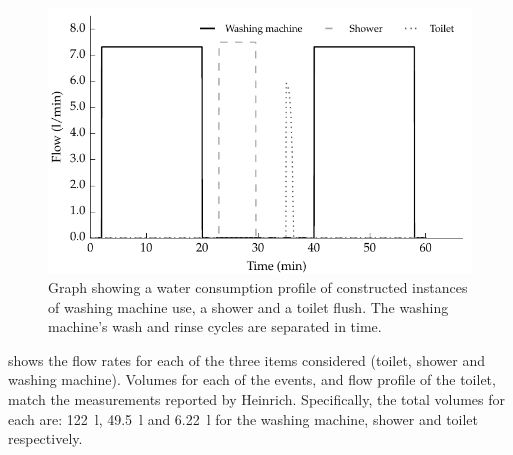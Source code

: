     \begin{figure}
      \centering
      \includegraphics[width=\linewidth]{content/pt1/02-WirelessWaterMeter/graphics/graph_profile}
      \caption[Graph showing a water consumption profile of constructed instances of washing machine use, a shower and a toilet flush.]{
          Graph showing a water consumption profile of constructed instances of washing machine use, a shower and a toilet flush.
          The washing machine's wash and rinse cycles are separated in time.}
      \label{fig:profileSample}
    \end{figure}
     shows the flow rates for each of the three items considered (toilet, shower and washing machine).
    Volumes for each of the events, and flow profile of the toilet, match the measurements reported by Heinrich.
    Specifically, the total volumes for each are: \SI{122}{\litre}, \SI{49.5}{\litre} and \SI{6.22}{\litre} for the washing machine, shower and toilet respectively.

